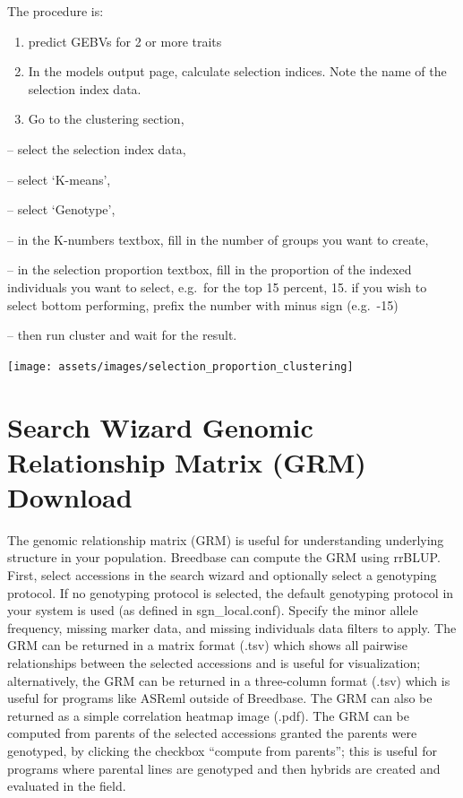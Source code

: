 \documentclass[
  12pt,
]{book}
\begin{document}
The procedure is:

\begin{enumerate}
\def\labelenumi{(\arabic{enumi})}
\item
  predict GEBVs for 2 or more traits
\item
  In the models output page, calculate selection indices. Note the name of the selection index data.
\item
  Go to the clustering section,
\end{enumerate}

-- select the selection index data,

-- select `K-means',

-- select `Genotype',

-- in the K-numbers textbox, fill in the number of groups you want to create,

-- in the selection proportion textbox, fill in the proportion of the indexed individuals you want to select, e.g.~for the top 15 percent, 15. if you wish to select bottom performing, prefix the number with minus sign (e.g.~-15)

-- then run cluster and wait for the result.

\begin{center}\texttt{[image: assets/images/selection\_proportion\_clustering]} \end{center}

\hypertarget{search-wizard-genomic-relationship-matrix-grm-download}{%
\section{Search Wizard Genomic Relationship Matrix (GRM) Download}\label{search-wizard-genomic-relationship-matrix-grm-download}}

The genomic relationship matrix (GRM) is useful for understanding underlying structure in your population. Breedbase can compute the GRM using rrBLUP. First, select accessions in the search wizard and optionally select a genotyping protocol. If no genotyping protocol is selected, the default genotyping protocol in your system is used (as defined in sgn\_local.conf). Specify the minor allele frequency, missing marker data, and missing individuals data filters to apply. The GRM can be returned in a matrix format (.tsv) which shows all pairwise relationships between the selected accessions and is useful for visualization; alternatively, the GRM can be returned in a three-column format (.tsv) which is useful for programs like ASReml outside of Breedbase. The GRM can also be returned as a simple correlation heatmap image (.pdf). The GRM can be computed from parents of the selected accessions granted the parents were genotyped, by clicking the checkbox ``compute from parents''; this is useful for programs where parental lines are genotyped and then hybrids are created and evaluated in the field.
\end{document}
